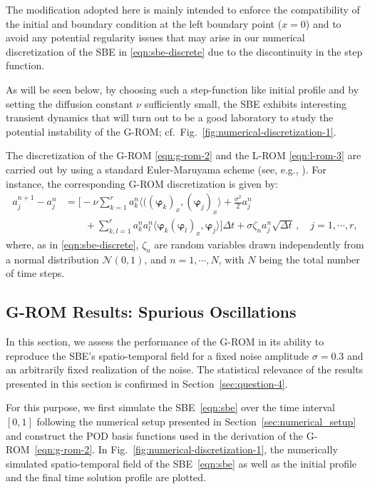 \documentclass[11pt]{amsart}
\numberwithin{equation}{section}
\def\bea{\begin{equation} \begin{aligned}}
\def\eea{\end{aligned} \end{equation}}
\newcommand{\bphi}{\boldsymbol{\varphi}}
\begin{document}
The modification adopted here is mainly intended to enforce the compatibility of the initial and boundary condition at the left boundary point ($x=0$) and to avoid any potential regularity issues that may arise in our numerical discretization of the SBE in \eqref{eqn:sbe-discrete} due to the discontinuity in the step function. 

As will be seen below, by choosing such a step-function like initial profile and by setting the diffusion constant $\nu$ sufficiently small, the SBE exhibits interesting transient dynamics that will turn out to be a good laboratory to study the potential instability of the G-ROM; cf.~Fig.~\ref{fig:numerical-discretization-1}.


\medskip 
{} The discretization of the G-ROM \eqref{eqn:g-rom-2} and the L-ROM \eqref{eqn:l-rom-3}  are carried out by using a standard Euler-Maruyama scheme (see, e.g., \cite[p.~305]{KP92}). For instance, the corresponding G-ROM discretization is given by: 
\bea  \label{eqn:g-rom-3}
a_{j}^{n+1} - a_{j}^{n} & =  \Big [ - \nu  \sum_{k = 1}^r  a^n_k \big \langle \big( (\bphi_k)_{x}, (\bphi_j)_{x} \big \rangle + \frac{\sigma^2}{2}a_{j}^{n} \\
&  \qquad    + \sum_{k,l = 1}^r a^n_k a^n_l   \big \langle \bphi_k (\bphi_l)_x, \bphi_j \big \rangle \Big] \Delta t + \sigma \zeta_n   a_{j}^{n} \sqrt{\Delta t} \, , \quad j = 1, \cdots, r,
\eea
where, as in \eqref{eqn:sbe-discrete}, $\zeta_n$ are random variables drawn independently from a normal distribution $\mathcal{N}(0,1)$, and $n = 1,\cdots, N$, with $N$ being the total number of time steps.


\subsection{G-ROM Results: Spurious Oscillations}
	\label{sec:questions-1-2}

In this section, we assess the performance of the G-ROM in its ability to reproduce the SBE's spatio-temporal field for a fixed noise amplitude $\sigma = 0.3$ and an arbitrarily fixed realization of the noise. The statistical relevance of the results presented in this section is confirmed in Section~\ref{sec:question-4}.  

For this purpose, we first simulate the SBE~\eqref{eqn:sbe} over the time interval $[0,1]$ following the numerical setup presented in Section~\ref{sec:numerical_setup} and construct the POD basis functions used in the derivation of the G-ROM~\eqref{eqn:g-rom-2}. 
In Fig.~\ref{fig:numerical-discretization-1}, the numerically simulated spatio-temporal field of the SBE~\eqref{eqn:sbe} as well as the initial profile and the final time solution profile are plotted. 
\end{document}
